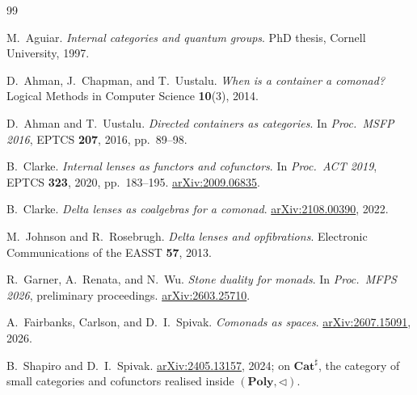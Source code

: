 \documentclass[11pt,a4paper]{amsart}
\newcommand{\Poly}{\mathbf{Poly}}
\theoremstyle{plain}
\theoremstyle{definition}
\theoremstyle{remark}
\begin{document}
\begin{thebibliography}{99}

M.~Aguiar.
\emph{Internal categories and quantum groups}.
PhD thesis, Cornell University, 1997.

D.~Ahman, J.~Chapman, and T.~Uustalu.
\emph{When is a container a comonad?}
Logical Methods in Computer Science \textbf{10}(3), 2014.

D.~Ahman and T.~Uustalu.
\emph{Directed containers as categories}.
In \emph{Proc.\ MSFP 2016}, EPTCS \textbf{207}, 2016, pp.\ 89--98.

B.~Clarke.
\emph{Internal lenses as functors and cofunctors}.
In \emph{Proc.\ ACT 2019}, EPTCS \textbf{323}, 2020, pp.\ 183--195.
\href{https://arxiv.org/abs/2009.06835}{arXiv:2009.06835}.

B.~Clarke.
\emph{Delta lenses as coalgebras for a comonad}.
\href{https://arxiv.org/abs/2108.00390}{arXiv:2108.00390}, 2022.

M.~Johnson and R.~Rosebrugh.
\emph{Delta lenses and opfibrations}.
Electronic Communications of the EASST \textbf{57}, 2013.

R.~Garner, A.~Renata, and N.~Wu.
\emph{Stone duality for monads}.
In \emph{Proc.\ MFPS 2026}, preliminary proceedings.
\href{https://arxiv.org/abs/2603.25710}{arXiv:2603.25710}.

A.~Fairbanks, Carlson, and D.~I.~Spivak.
\emph{Comonads as spaces}.
\href{https://arxiv.org/abs/2607.15091}{arXiv:2607.15091}, 2026.

B.~Shapiro and D.~I.~Spivak.
\href{https://arxiv.org/abs/2405.13157}{arXiv:2405.13157}, 2024;
on $\mathbf{Cat}^\sharp$, the category of small categories and cofunctors realised
inside $(\Poly,\triangleleft)$.

\end{thebibliography}
\end{document}
